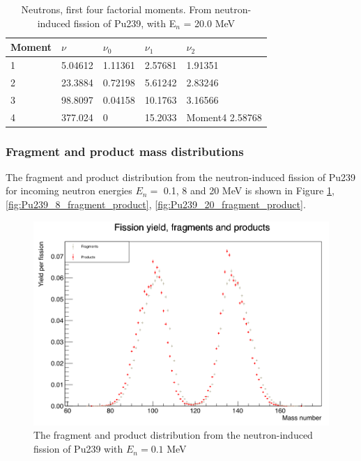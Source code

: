 \documentclass[]{article}
\begin{document}
\begin{table} [H]
	\centering
	\caption{Neutrons, first four factorial moments. From neutron-induced fission of Pu239, with E$_n$ = 20.0 MeV }
	\begin{tabularx}{\textwidth}{XXXXX} \hline
		\label{tab:Pu239_n_moments_20}
		Moment & $\nu$ & $\nu_0$ & $\nu_1$ & $\nu_2$ \\ \hline
		1 & 5.04612 & 1.11361 & 2.57681 & 1.91351\\
		2 & 23.3884 & 0.72198 & 5.61242 & 2.83246\\
		3 & 98.8097 & 0.04158 & 10.1763 & 3.16566\\
		4 & 377.024 & 0 & 15.2033 & Moment4 2.58768\\ 
	\end{tabularx}
\end{table}

\subsubsection{Fragment and product mass distributions}

The fragment and product distribution from the neutron-induced fission of Pu239 for incoming neutron energies $E_n=$ 0.1, 8 and 20 MeV is shown in Figure \ref{fig:Pu239_0_1_fragment_product}, \ref{fig:Pu239_8_fragment_product}, \ref{fig:Pu239_20_fragment_product}.

\begin{figure} [H]
	\centering
	\includegraphics[scale=0.36]{Pu239_0_1_fragment_product.png}
	\caption{The fragment and product distribution from the neutron-induced fission of Pu239 with $E_n = 0.1$ MeV}
	\label{fig:Pu239_0_1_fragment_product}
\end{figure}
\end{document}
